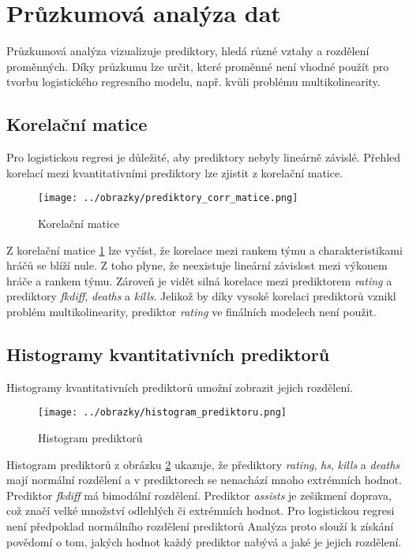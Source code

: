 \section{Průzkumová analýza dat}
Průzkumová analýza vizualizuje prediktory, hledá různé vztahy a rozdělení proměnných. Díky průzkumu lze určit, které proměnné není vhodné použít pro tvorbu
logistického regresního modelu, např. kvůli problému multikolinearity.

\newpage
\subsection{Korelační matice}
Pro logistickou regresi je důležité, aby prediktory nebyly lineárně závislé. Přehled korelací mezi kvantitativními prediktory lze zjistit z korelační matice.

\begin{figure}[H]
    \centering
    \texttt{[image: ../obrazky/prediktory\_corr\_matice.png]}
    \caption{Korelační matice} 
    \label{fig:korelacni_matice}
\end{figure}

Z korelační matice \ref{fig:korelacni_matice} lze vyčíst, 
{\color{red}
že korelace mezi rankem týmu a charakteristikami hráčů se blíží nule. Z toho plyne, že neexistuje lineární závislost mezi výkonem hráče a 
rankem týmu.
}
Zároveň je vidět silná korelace mezi prediktorem \textit{rating} a prediktory \textit{fkdiff}, \textit{deaths} a \textit{kills}.
{\color{red}
Jelikož by díky vysoké korelaci prediktorů vznikl problém multikolinearity, prediktor \textit{rating} ve finálních modelech není použit.
}

\newpage
\subsection{Histogramy kvantitativních prediktorů}
Histogramy kvantitativních prediktorů umožní zobrazit jejich rozdělení.

\begin{figure}[H]
    \centering
    \texttt{[image: ../obrazky/histogram\_prediktoru.png]}
    \caption{Histogram prediktorů} 
    \label{fig:histogram_prediktoru}
\end{figure}

{\color{red}
Histogram prediktorů z obrázku \ref{fig:histogram_prediktoru} ukazuje, že přediktory \textit{rating}, \textit{hs}, \textit{kills} a \textit{deaths} mají normální rozdělení
a v prediktorech se nenachází mnoho extrémních hodnot.
}
Prediktor \textit{fkdiff} má bimodální rozdělení. Prediktor \textit{assists} je 
{\color{red}
zešikmení
}
doprava, což značí velké množství odlehlých či extrémních hodnot. 
{\color{red}
Pro logistickou regresi není předpoklad normálního rozdělení prediktorů Analýza proto slouží k získání povědomí o tom, 
jakých hodnot každý prediktor nabývá a jaké je jejich rozdělení.
}

